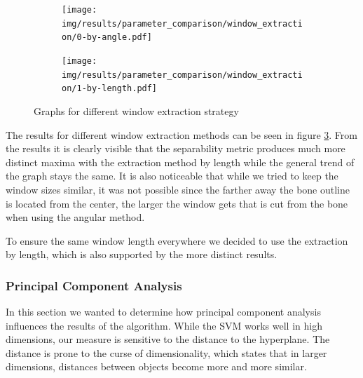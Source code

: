 \documentclass[pdftex,12pt,a4paper]{report}
\begin{document}
\begin{figure}[h]
	\centering
	\begin{subfigure}[b]{0.32\textwidth}
		\centering
		\texttt{[image: img/results/parameter\_comparison/window\_extraction/0-by-angle.pdf]}
		\label{fig:window-extraction-graphs-0}
	\end{subfigure}
	\begin{subfigure}[b]{0.32\textwidth}
		\centering
		\texttt{[image: img/results/parameter\_comparison/window\_extraction/1-by-length.pdf]}
		\label{fig:window-extraction-graphs-1}
	\end{subfigure}
	\caption{Graphs for different window extraction strategy}
	\label{fig:window-extraction-graphs}
\end{figure}

The results for different window extraction methods can be seen in figure \ref{fig:window-extraction-graphs}. From the results it is clearly visible that the separability metric produces much more distinct maxima with the extraction method by length while the general trend of the graph stays the same. It is also noticeable that while we tried to keep the window sizes similar, it was not possible since the farther away the bone outline is located from the center, the larger the window gets that is cut from the bone when using the angular method.

To ensure the same window length everywhere we decided to use the extraction by length, which is also supported by the more distinct results.

\subsubsection{Principal Component Analysis}

In this section we wanted to determine how principal component analysis influences the results of the algorithm. While the SVM works well in high dimensions, our measure is sensitive to the distance to the hyperplane. The distance is prone to the curse of dimensionality, which states that in larger dimensions, distances between objects become more and more similar.
\end{document}
